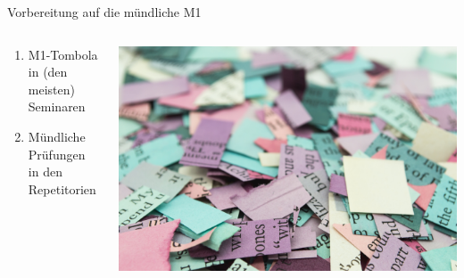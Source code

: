 \documentclass[aspectratio=169]{beamer}
\begin{document}
\begin{frame}{Vorbereitung auf die mündliche M1}

\begin{columns}[c]
    \begin{column}{5cm}
\begin{enumerate}
    \item 
    M1-Tombola in (den meisten) Seminaren
    \item 
    Mündliche Prüfungen in den Repetitorien
\end{enumerate}
        
    \end{column}

    \begin{column}{5cm}
\includegraphics[width=\textwidth]{mel-poole-gT-Sob4njj8-unsplash.jpg}        
    \end{column}

\end{columns}





    
\end{frame}
\end{document}
